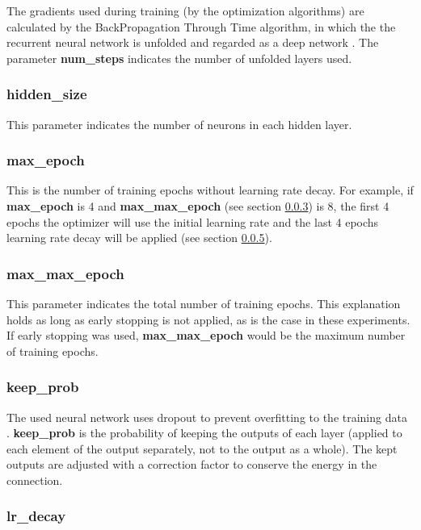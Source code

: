 \documentclass[10pt,a4paper,titlepage]{article}
\begin{document}
The gradients used during training (by the optimization algorithms) are calculated by the BackPropagation Through Time algorithm, in which the the recurrent neural network is unfolded and regarded as a deep network \cite{bptt}. The parameter \textbf{num\_steps} indicates the number of unfolded layers used.

\subsubsection{hidden\_size}

This parameter indicates the number of neurons in each hidden layer.

\subsubsection{max\_epoch}
\label{subsubsec:max}

This is the number of training epochs without learning rate decay. For example, if \textbf{max\_epoch} is 4 and \textbf{max\_max\_epoch} (see section \ref{subsubsec:maxmax}) is 8, the first 4 epochs the optimizer will use the initial learning rate and the last 4 epochs learning rate decay will be applied (see section \ref{subsubsec:decay}).

\subsubsection{max\_max\_epoch}
\label{subsubsec:maxmax}

This parameter indicates the total number of training epochs. This explanation holds as long as early stopping is not applied, as is the case in these experiments. If early stopping was used, \textbf{max\_max\_epoch} would be the maximum number of training epochs.

\subsubsection{keep\_prob}

The used neural network uses dropout to prevent overfitting to the training data \cite{dropout}. \textbf{keep\_prob} is the probability of keeping the outputs of each layer (applied to each element of the output separately, not to the output as a whole). The kept outputs are adjusted with a correction factor to conserve the energy in the connection.

\subsubsection{lr\_decay}
\label{subsubsec:decay}
\end{document}
